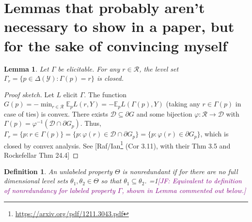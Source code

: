 \documentclass[12pt]{article}
\newcommand{\Comments}{1}
\newcommand{\mynote}[2]{\ifnum\Comments=1\textcolor{#1}{#2}\fi}
\newcommand{\mytodo}[2]{\ifnum\Comments=1%
  \todo[linecolor=#1!80!black,backgroundcolor=#1,bordercolor=#1!80!black]{#2}\fi}
\newcommand{\raft}[1]{\mytodo{green!20!white}{RF: #1}}
\newcommand{\jessie}[1]{\mynote{purple}{[JF: #1]}}
\newcommand{\D}{\mathcal{D}}
\newcommand{\E}{\mathbb{E}}
\newcommand{\R}{\mathcal{R}}
\newcommand{\Y}{\mathcal{Y}}
\newtheorem{lemma}{Lemma}
\newtheorem{definition}{Definition}
\begin{document}
%
%
%



\section{Lemmas that probably aren't necessary to show in a paper, but for the sake of convincing myself}

\begin{lemma}\label{lem:closed-level-sets}
	Let $\Gamma$ be elicitable.
	For any $r\in\R$, the level set $\Gamma_r = \{ p \in \Delta(\Y) : \Gamma(p) = r \}$ is closed.
\end{lemma}
\begin{proof}[Proof sketch]
	Let $L$ elicit $\Gamma$.
	The function $G(p) = -\min_{r\in\R} \E_p L(r,Y) = -\E_p L(\Gamma(p),Y)$ (taking any $r\in\Gamma(p)$ in case of ties) is convex.
	There exists $\D \subseteq \partial G$ and some bijection $\varphi : \R \to \D$ with $\Gamma(p) = \varphi^{-1}(\D\cap \partial G_p)$.
	Thus, $\Gamma_r = \{p : r\in\Gamma(p)\} = \{p : \varphi(r) \in \D\cap\partial G_p\} = \{p : \varphi(r) \in \partial G_p\}$, which is closed by convex analysis.
	See [Raf/Ian\footnote{\url{https://arxiv.org/pdf/1211.3043.pdf}} (Cor 3.11), with their Thm 3.5 and Rockefellar Thm 24.4]  
\end{proof}


\begin{definition}\label{def:unlabeled-nonredundant}
	An unlabeled property $\Theta$ is \emph{nonredundant} if for there are no full dimensional level sets $\theta_1, \theta_2 \in \Theta$ so that $\theta_1 \subseteq \theta_2$.
	\jessie{Equivalent to definition of nonredundancy for labeled property $\Gamma$, shown in Lemma commented out below.}
\end{definition}
\end{document}

